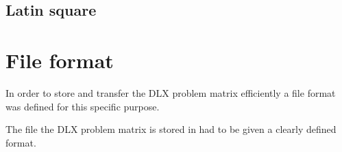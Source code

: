 \subsection{Latin square}



\section{File format}

In order to store and transfer the DLX problem matrix efficiently a file format was defined for this specific purpose.

The file the DLX problem matrix is stored in had to be given a clearly defined format. 



